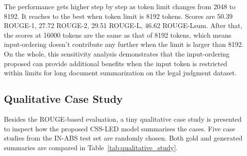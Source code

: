\documentclass[11pt, a4paper]{article}
\theoremstyle{plain}%
\theoremstyle{remark}%
\theoremstyle{definition}%
\begin{document}
The performance gets higher step by step as token limit changes from 2048 to 8192. It reaches to the best when token limit is 8192 tokens. Scores are 50.39 ROUGE-1, 27.72 ROUGE-2, 29.51 ROUGE-L, 46.62 ROUGE-Lsum. After that, the scores at 16000 tokens are the same as that of 8192 tokens, which means input-ordering doesn’t contribute any further when the limit is larger than 8192. On the whole, this sensitivity analysis demonstrates that the input-ordering proposed can provide additional benefits when the input token is restricted within limits for long document summarization on the legal judgment dataset.

\subsection{Qualitative Case Study}
Besides the ROUGE-based evaluation, a tiny qualitative case study is presented to inspect how the proposed CSS-LED model summarises the cases. Five case studies from the IN-ABS test set are randomly chosen. Both gold and generated summaries are compared in Table~\ref{tab:qualitative_study}.
\end{document}
